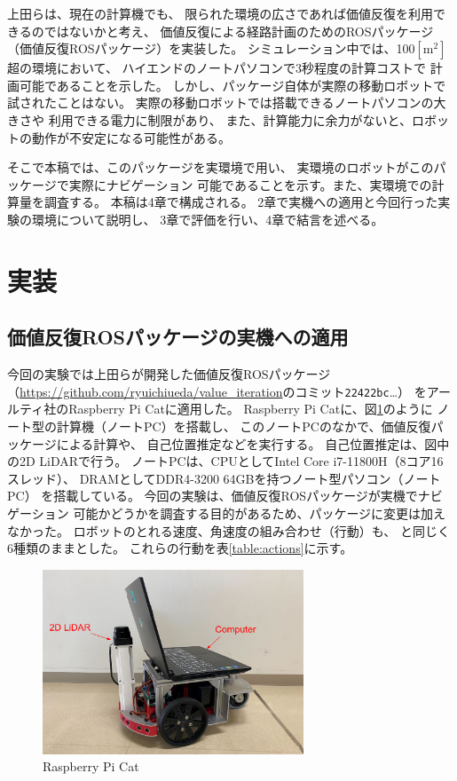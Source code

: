 \documentclass{jarticle}
\begin{document}
上田らは、現在の計算機でも、
限られた環境の広さであれば価値反復を利用できるのではないかと考え、
価値反復による経路計画のためのROSパッケージ
（価値反復ROSパッケージ）を実装した\cite{上田rsj2021}。
シミュレーション中では、100$\mathrm{[m^2]}$超の環境において、
ハイエンドのノートパソコンで3秒程度の計算コストで
計画可能であることを示した。
しかし、パッケージ自体が実際の移動ロボットで試されたことはない。
実際の移動ロボットでは搭載できるノートパソコンの大きさや
利用できる電力に制限があり、
また、計算能力に余力がないと、ロボットの動作が不安定になる可能性がある。

そこで本稿では、このパッケージを実環境で用い、
実環境のロボットがこのパッケージで実際にナビゲーション
可能であることを示す。また、実環境での計算量を調査する。
本稿は4章で構成される。
2章で実機への適用と今回行った実験の環境について説明し、
3章で評価を行い、4章で結言を述べる。

\section{実装}%

\subsection{価値反復ROSパッケージの実機への適用}

今回の実験では上田らが開発した価値反復ROSパッケージ
（\url{https://github.com/ryuichiueda/value_iteration}のコミット\texttt{22422bc}\dots）
\cite{上田rsj2021}をアールティ社のRaspberry Pi Catに適用した。
Raspberry Pi Catに、図\ref{fig:raspicat}のように
ノート型の計算機（ノートPC）を搭載し、
このノートPCのなかで、価値反復パッケージによる計算や、
自己位置推定などを実行する。
自己位置推定は、図中の2D LiDARで行う。
ノートPCは、CPUとしてIntel Core i7-11800H（8コア16スレッド）、
DRAMとしてDDR4-3200 64GBを持つノート型パソコン（ノートPC）
を搭載している。
今回の実験は、価値反復ROSパッケージが実機でナビゲーション
可能かどうかを調査する目的があるため、パッケージに変更は加えなかった。
ロボットのとれる速度、角速度の組み合わせ（行動）も、
\cite{上田rsj2021}と同じく6種類のままとした。
これらの行動を表\ref{table:actions}に示す。

\begin{figure}[htb]
  \centering
   \includegraphics[height=55mm]{./figs/raspicat.png}
   \caption{Raspberry Pi Cat}
	\label{fig:raspicat}
\end{figure}
\end{document}
